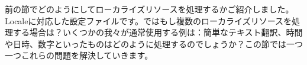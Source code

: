 前の節でどのようにしてローカライズリソースを処理するかご紹介しました。Localeに対応した設定ファイルです。ではもし複数のローカライズリソースを処理する場合は？いくつかの我々が通常使用する例は：簡単なテキスト翻訳、時間や日時、数字といったものはどのように処理するのでしょうか？この節では一つ一つこれらの問題を解決していきます。
